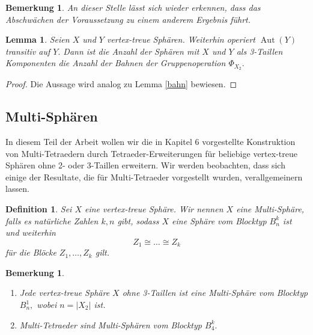 \documentclass[12pt,titlepage,twoside,cleardoublepage]{article}
\theoremstyle{nummermitklammern}
\newtheorem{lemma}[temp]{Lemma}
\newtheorem{definition}[temp]{Definition}
\newtheorem{bemerkung}[temp]{Bemerkung}
\newtheorem{definition}[zahl]{Definition}
\newtheorem{lemma}[zahl]{Lemma}
\newtheorem{bemerkung}[zahl]{Bemerkung}
\numberwithin{equation}{section}
\DeclareMathOperator{\Aut}{Aut}
\begin{document}
\begin{bemerkung}
An dieser Stelle lässt sich wieder erkennen, dass das Abschwächen
der Voraussetzung zu einem anderem Ergebnis führt.
\end{bemerkung}


\begin{lemma}
Seien $X$ und $Y$ vertex-treue Sphären. Weiterhin operiert $\Aut(Y)$ transitiv auf $Y.$ Dann ist die Anzahl der Sphären mit $X$ und $Y$ als 3-Taillen Komponenten die Anzahl der Bahnen der Gruppenoperation $\Phi_{X_2}.$
\end{lemma}
\begin{proof}
Die Aussage wird analog zu Lemma \ref{bahn} bewiesen.
\end{proof}
\subsection{Multi-Sphären}
In diesem Teil der Arbeit wollen wir die in Kapitel 6 vorgestellte Konstruktion von Multi-Tetraedern durch Tetraeder-Erweiterungen für beliebige vertex-treue Sphären ohne 2- oder 3-Taillen erweitern. Wir werden beobachten, dass sich einige der Resultate, die für Multi-Tetraeder vorgestellt wurden, verallgemeinern lassen.
\begin{definition}
Sei $X$ eine vertex-treue Sphäre. Wir nennen $X$ eine \emph{Multi-Sphäre}, falls es natürliche Zahlen $k,n$ gibt, sodass $X$ eine Sphäre vom Blocktyp $B_n^k$ ist und weiterhin
\[
 Z_1\cong \ldots\cong Z_k
\]
für die Blöcke $Z_1,\ldots,Z_k$ gilt. 
\end{definition}
\begin{bemerkung}
\begin{enumerate}
\item Jede vertex-treue Sphäre $X$ ohne 3-Taillen ist eine Multi-Sphäre vom Blocktyp $B_n^1,$ wobei $n=\vert X_2\vert$ ist.
\item Multi-Tetraeder sind Multi-Sphären vom Blocktyp $B_4^k.$
\end{enumerate}
\end{bemerkung}
\end{document}
